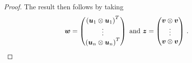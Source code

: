 \begin{proof}
The result then follows by taking
\begin{equation*}
  \boldsymbol{w} = \begin{pmatrix} \left(\boldsymbol{u}_{1} \otimes \boldsymbol{u}_{1}\right)^{T} \\ \vdots \\ \left(\boldsymbol{u}_{n} \otimes \boldsymbol{u}_{n}\right)^{T} \end{pmatrix}
  \mbox{ and } \boldsymbol{z} = \begin{pmatrix} \boldsymbol{v} \otimes \boldsymbol{v} \\ \vdots \\ \boldsymbol{v} \otimes \boldsymbol{v} \end{pmatrix} \, .
\end{equation*}
\end{proof}
